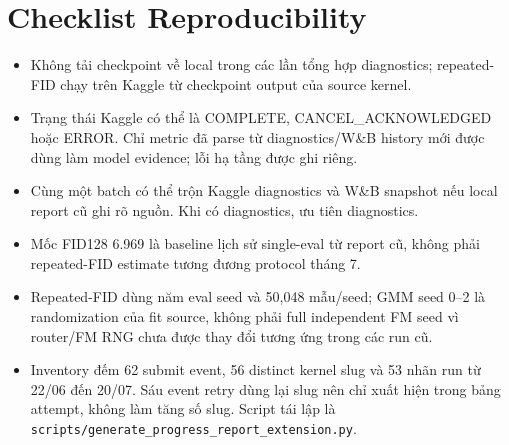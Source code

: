\documentclass[11pt,a4paper]{article}
\newcommand{\run}[1]{{\small\nolinkurl{#1}}}
\begin{document}
\section{Checklist Reproducibility}

\begin{itemize}
  \item Không tải checkpoint về local trong các lần tổng hợp diagnostics; repeated-FID chạy trên Kaggle từ checkpoint output của source kernel.
  \item Trạng thái Kaggle có thể là COMPLETE, CANCEL\_ACKNOWLEDGED hoặc ERROR. Chỉ metric đã parse từ diagnostics/W\&B history mới được dùng làm model evidence; lỗi hạ tầng được ghi riêng.
  \item Cùng một batch có thể trộn Kaggle diagnostics và W\&B snapshot nếu local report cũ ghi rõ nguồn. Khi có diagnostics, ưu tiên diagnostics.
  \item Mốc FID128 6.969 là baseline lịch sử single-eval từ report cũ, không phải repeated-FID estimate tương đương protocol tháng 7.
  \item Repeated-FID dùng năm eval seed và 50,048 mẫu/seed; GMM seed 0--2 là randomization của fit source, không phải full independent FM seed vì router/FM RNG chưa được thay đổi tương ứng trong các run cũ.
  \item Inventory đếm 62 submit event, 56 distinct kernel slug và 53 nhãn run từ 22/06 đến 20/07. Sáu event retry dùng lại slug nên chỉ xuất hiện trong bảng attempt, không làm tăng số slug. Script tái lập là \run{scripts/generate_progress_report_extension.py}.
\end{itemize}
\end{document}
